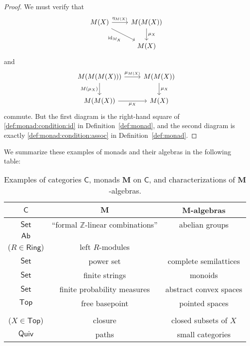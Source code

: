 \documentclass{article}
\theoremstyle{definition}
\newcommand{\C}{\mathsf{C}}
\DeclareMathOperator{\id}{id}
\begin{document}
\begin{proof}
    We must verify that
    \[\begin{tikzcd}[ampersand replacement=\&]
    	M(X) \& {M(M(X))} \\
    	\& M(X)
    	\arrow["{\eta_{M(X)}}", from=1-1, to=1-2]
    	\arrow["\mu_X", from=1-2, to=2-2]
    	\arrow["\id_{M_X}"', from=1-1, to=2-2]
    \end{tikzcd}\]
    and
    \[\begin{tikzcd}[ampersand replacement=\&]
    	{M(M(M(X)))} \& {M(M(X))} \\
    	{M(M(X))} \& M(X)
    	\arrow["{\mu_{M(X)}}", from=1-1, to=1-2]
    	\arrow["\mu_X", from=1-2, to=2-2]
    	\arrow["{M(\mu_X)}"', from=1-1, to=2-1]
    	\arrow["\mu_X"', from=2-1, to=2-2]
    \end{tikzcd}\]
    commute. But the first diagram is the right-hand square of \ref{def:monad:condition:id} in Definition~\ref{def:monad}, and the second diagram is exactly \ref{def:monad:condition:assoc} in Definition~\ref{def:monad}.
\end{proof}

We summarize these examples of monads and their algebras in the following table:

\begin{table}[h]
    \centering
    \def\arraystretch{1.5}
    \begin{tabular}{c|c|c}
         $\C$ & $\mathbf{M}$ & $\mathbf{M}$-algebras \\ \hline
         $\mathsf{Set}$ & ``formal $\mathbb{Z}$-linear combinations'' & abelian groups \\
         $\mathsf{Ab}$ & \makecell{$R \otimes {-}$ \\ {\color{gray} ($R \in \mathsf{Ring}$)}}  & left $R$-modules \\
         $\mathsf{Set}$ & power set & complete semilattices \\
         $\mathsf{Set}$ & finite strings & monoids \\
         $\mathsf{Set}$ & finite probability measures & abstract convex spaces \\
         $\mathsf{Top}$ & free basepoint & pointed spaces \\
         \makecell{$\mathcal{P}(X)$ \\ {\color{gray} ($X \in \mathsf{Top}$)}} & closure & closed subsets of $X$ \\
         $\mathsf{Quiv}$ & paths & small categories
    \end{tabular}
    \caption{Examples of categories $\C$, monads $\mathbf{M}$ on $\C$, and characterizations of $\mathbf{M}$-algebras.}
    \label{table:examples:monads-and-algebras}
\end{table}
\end{document}
